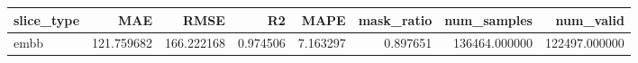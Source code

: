 \begin{tabular}{lrrrrrrr}
\toprule
slice_type & MAE & RMSE & R2 & MAPE & mask_ratio & num_samples & num_valid \\
\midrule
embb & 121.759682 & 166.222168 & 0.974506 & 7.163297 & 0.897651 & 136464.000000 & 122497.000000 \\
\bottomrule
\end{tabular}
